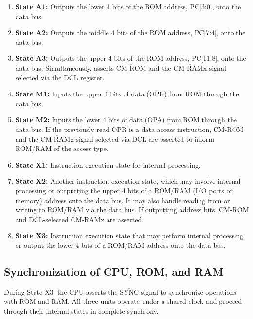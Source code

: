 \begin{enumerate}
  \item \textbf{State A1:} Outputs the lower 4 bits of the ROM address, PC[3:0], onto the data bus.
  
  \item \textbf{State A2:} Outputs the middle 4 bits of the ROM address, PC[7:4], onto the data bus.

  \item \textbf{State A3:} Outputs the upper 4 bits of the ROM address, PC[11:8], onto the data bus. Simultaneously, asserts $\overline{\text{CM-ROM}}$ and the $\overline{\text{CM-RAMx}}$ signal selected via the DCL register.

  \item \textbf{State M1:} Inputs the upper 4 bits of data (OPR) from ROM through the data bus.

  \item \textbf{State M2:} Inputs the lower 4 bits of data (OPA) from ROM through the data bus. If the previously read OPR is a data access instruction, $\overline{\text{CM-ROM}}$ and the $\overline{\text{CM-RAMx}}$ signal selected via DCL are asserted to inform ROM/RAM of the access type.

  \item \textbf{State X1:} Instruction execution state for internal processing.

  \item \textbf{State X2:} Another instruction execution state, which may involve internal processing or outputting the upper 4 bits of a ROM/RAM (I/O ports or memory) address onto the data bus. It may also handle reading from or writing to ROM/RAM via the data bus. If outputting address bits, $\overline{\text{CM-ROM}}$ and DCL-selected $\overline{\text{CM-RAMx}}$ are asserted.

  \item \textbf{State X3:} Instruction execution state that may perform internal processing or output the lower 4 bits of a ROM/RAM address onto the data bus.
\end{enumerate}

\subsection{Synchronization of CPU, ROM, and RAM}
During State X3, the CPU asserts the $\overline{\text{SYNC}}$ signal to synchronize operations with ROM and RAM. All three units operate under a shared clock and proceed through their internal states in complete synchrony.

